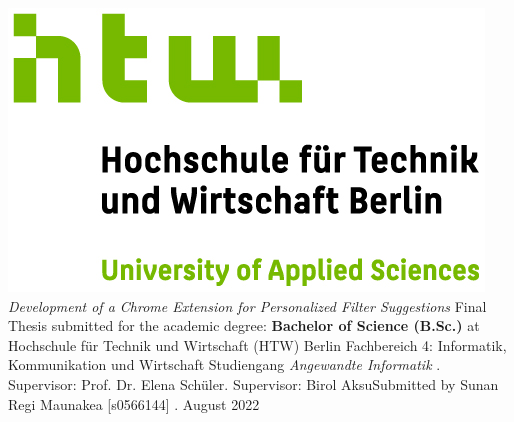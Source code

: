 \documentclass[oneside,bibliography=totocnumbered,BCOR=5mm]{scrbook}%
\theoremstyle{definition}
\theoremstyle{definition}
\theoremstyle{definition}
\theoremstyle{definition}
\theoremstyle{definition}
\theoremstyle{definition}
\begin{document}
\begin{titlepage}
  \begin{center}
    \includegraphics{assets/htw_berlin_logo_farbig.jpg}
    \linebreak[4]
    \linebreak[4]
    \linebreak[4]
    \linebreak[4]
    \textit{\large Development of a Chrome Extension for Personalized Filter Suggestions}
    \linebreak[4]
    \linebreak[4]
    \linebreak[4]
    Final Thesis
    \linebreak[4]
    \linebreak[4]
    submitted for the academic degree:
    \linebreak[4]
    \linebreak[4]
    \textbf{Bachelor of Science (B.Sc.)}
    \linebreak[4]
    \linebreak[4]
    at
    \linebreak[4]
    \linebreak[4]
    Hochschule f\"ur Technik und Wirtschaft (HTW) Berlin
    \linebreak[4]
    Fachbereich 4: Informatik, Kommunikation und Wirtschaft
    \linebreak[4]
    Studiengang \textit{Angewandte Informatik}
    \linebreak[4]
    \linebreak[4]
    . Supervisor: Prof. Dr. Elena Sch\"uler. Supervisor: Birol Aksu\linebreak[4]
    \linebreak[4]
    \linebreak[4]
    \linebreak[4]
    \linebreak[4]
    Submitted by Sunan Regi Maunakea [s0566144]
    \linebreak[4]
    \linebreak[4]
    \linebreak[4]
    . August 2022

  \end{center}
\end{titlepage}
\end{document}
